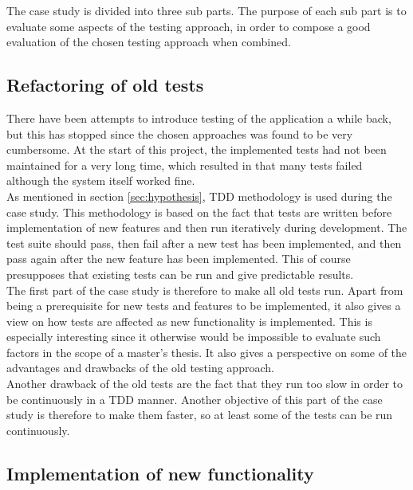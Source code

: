 
The case study is divided into three sub parts. The purpose of each
sub part is to evaluate some aspects of the testing approach, in order
to compose a good evaluation of the chosen testing approach when
combined.\\


\subsection{Refactoring of old tests}
\label{sec:casestudy_1}

There have been attempts to introduce testing of the application a while
back, but this has stopped since the chosen approaches was found to be
very cumbersome. At the start of this project, the implemented tests had
not been maintained for a very long time, which resulted in that many
tests failed although the system itself worked fine.\\

As mentioned in section \ref{sec:hypothesis}, TDD methodology is
used during the case study. This methodology is based on the fact that
tests are written before implementation of new features and then run
iteratively during development. The test suite should pass, then fail
after a new test has been implemented, and then pass again after the new
feature has been implemented. This of course presupposes that existing
tests can be run and give predictable results.\\

The first part of the case study is therefore to make all old tests run.
Apart from being a prerequisite for new tests and features to be
implemented, it also gives a view on how tests are affected as new
functionality is implemented. This is especially interesting since it
otherwise would be impossible to evaluate such factors in the scope of a
master's thesis. It also gives a perspective on some of the advantages
and drawbacks of the old testing approach.\\

Another drawback of the old tests are the fact that they run too slow in
order to be continuously in a TDD manner. Another objective of this part
of the case study is therefore to make them faster, so at least some of
the tests can be run continuously.\\


\subsection{Implementation of new functionality}
\label{sec:casestudy_2}

